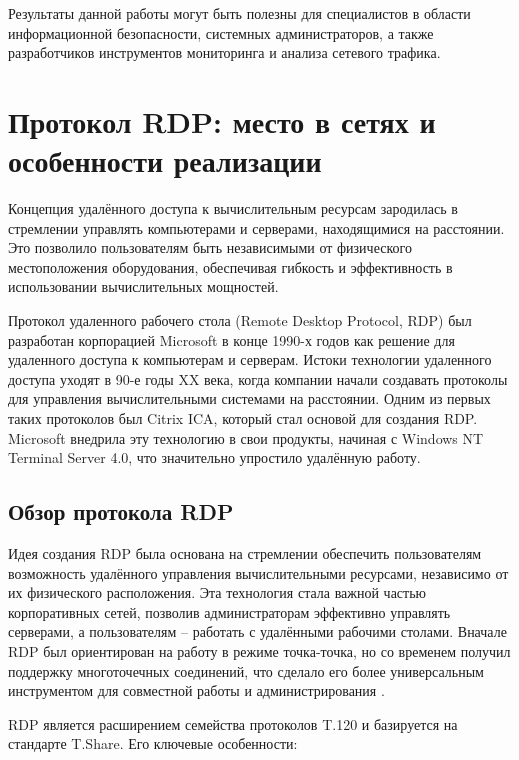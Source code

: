 \documentclass[bachelor, och, coursework]{SCWorks}
\begin{document}
Результаты данной работы могут быть полезны для специалистов в области информационной безопасности, системных администраторов, а также 
разработчиков инструментов мониторинга и анализа сетевого трафика.

\section{Протокол RDP: место в сетях и особенности реализации}

Концепция удалённого доступа к вычислительным ресурсам зародилась в стремлении управлять компьютерами и серверами, находящимися на расстоянии. 
Это позволило пользователям быть независимыми от физического местоположения оборудования, обеспечивая гибкость и эффективность в использовании 
вычислительных мощностей.

Протокол удаленного рабочего стола (Remote Desktop Protocol, RDP) был разработан корпорацией Microsoft в конце 1990-х годов как решение для 
удаленного доступа к компьютерам и серверам. Истоки технологии удаленного доступа уходят в 90-е годы XX века, когда компании начали создавать 
протоколы для управления вычислительными системами на расстоянии. Одним из первых таких протоколов был Citrix ICA, который стал основой для 
создания RDP. Microsoft внедрила эту технологию в свои продукты, начиная с Windows NT Terminal Server 4.0, что значительно упростило удалённую работу.

\subsection{Обзор протокола RDP}

Идея создания RDP была основана на стремлении обеспечить пользователям возможность удалённого управления вычислительными ресурсами, независимо от 
их физического расположения. Эта технология стала важной частью корпоративных сетей, позволив администраторам эффективно управлять серверами, а 
пользователям -- работать с удалёнными рабочими столами. Вначале RDP был ориентирован на работу в режиме точка-точка, но со временем получил 
поддержку многоточечных соединений, что сделало его более универсальным инструментом для совместной работы и администрирования \cite{rdp2}.

RDP является расширением семейства протоколов T.120 и базируется на стандарте T.Share. Его ключевые особенности:
\end{document}
